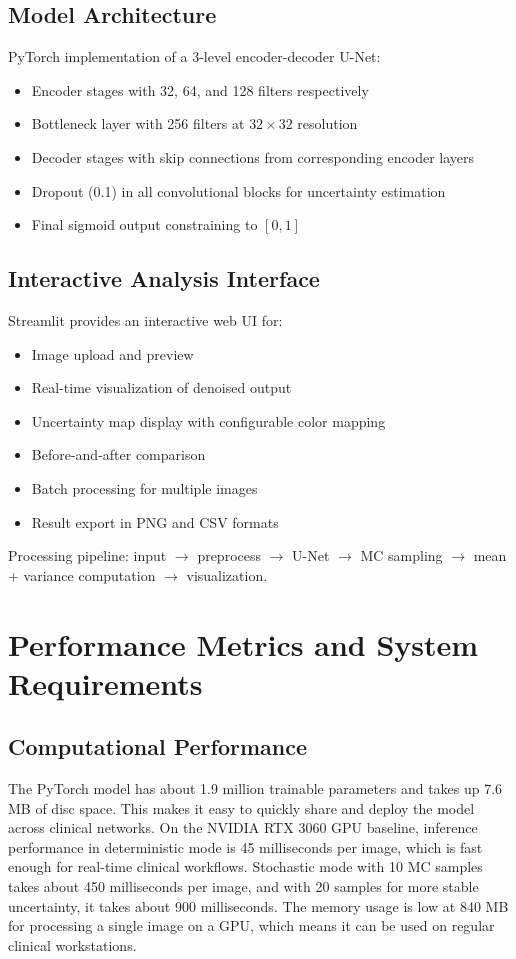 \documentclass[conference]{IEEEtran}
\begin{document}
\subsection{Model Architecture}
PyTorch implementation of a 3-level encoder-decoder U-Net:
\begin{itemize}
\item Encoder stages with 32, 64, and 128 filters respectively
\item Bottleneck layer with 256 filters at $32\times32$ resolution
\item Decoder stages with skip connections from corresponding encoder layers
\item Dropout (0.1) in all convolutional blocks for uncertainty estimation
\item Final sigmoid output constraining to $[0,1]$
\end{itemize}

\subsection{Interactive Analysis Interface}
Streamlit provides an interactive web UI for:
\begin{itemize}
\item Image upload and preview
\item Real-time visualization of denoised output
\item Uncertainty map display with configurable color mapping
\item Before-and-after comparison
\item Batch processing for multiple images
\item Result export in PNG and CSV formats
\end{itemize}

Processing pipeline: input $\rightarrow$ preprocess $\rightarrow$ U-Net $\rightarrow$ MC sampling $\rightarrow$ mean + variance computation $\rightarrow$ visualization.

\section{Performance Metrics and System Requirements}
\subsection{Computational Performance}
The PyTorch model has about 1.9 million trainable parameters and takes up 7.6 MB of disc space. This makes it easy to quickly share and deploy the model across clinical networks. On the NVIDIA RTX 3060 GPU baseline, inference performance in deterministic mode is 45 milliseconds per image, which is fast enough for real-time clinical workflows. Stochastic mode with 10 MC samples takes about 450 milliseconds per image, and with 20 samples for more stable uncertainty, it takes about 900 milliseconds. The memory usage is low at 840 MB for processing a single image on a GPU, which means it can be used on regular clinical workstations.
\end{document}

